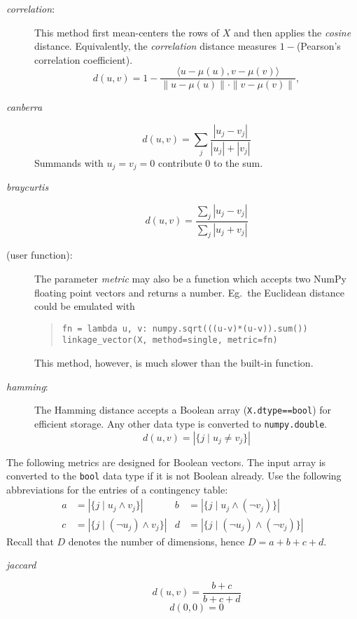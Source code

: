 \documentclass[fontsize=10pt,paper=letter,BCOR=-6mm,DIV=8]{scrartcl}
\makeatletter
\newcommand*\q{\textquotesingle}
\newenvironment{methods}{%
  \list{}{\labelwidth\z@
    \itemindent-\leftmargin
    \let\makelabel\methodslabel}%
}{%
  \endlist
}
\newcommand*{\methodslabel}[1]{%
  \hbox to \textwidth{\hspace{\labelsep}%
  \normalfont\bfseries\ttfamily
  #1\hskip-\labelsep\hfill}%
}
\makeatother
\begin{document}
\begin{methods}
\begin{description}
\item[\normalfont\textit{\q correlation\q}:] This method first mean-centers the rows of $X$ and then applies the \textit{cosine} distance. Equivalently, the \textit{correlation} distance measures $1-{}$\textrm{(Pearson's correlation coefficient)}.
\[
 d(u,v) = 1 - \frac{\langle u-\mu(u),v-\mu(v)\rangle}{\|u-\mu(u)\|\cdot\|v-\mu(v)\|},
\]

\item[\normalfont\textit{\q canberra\q}]
\[
 d(u,v) = \sum_j\frac{|u_j-v_j|}{|u_j|+|v_j|}
\]
Summands with $u_j=v_j=0$ contribute 0 to the sum.

\item[\normalfont\textit{\q braycurtis\q}]
\[
 d(u,v) = \frac{\sum_j |u_j-v_j|}{\sum_j |u_j+v_j|}
\]

\item[\textnormal{(user function):}] The parameter \textit{metric} may also be a function which accepts two NumPy floating point vectors and returns a number. Eg.\ the Euclidean distance could be emulated with
\begin{quote}
\texttt{fn = lambda u, v: numpy.sqrt(((u-v)*(u-v)).sum())}\\
\texttt{linkage\_vector(X, method=\q single\q, metric=fn)}
\end{quote}
This method, however, is much slower than the built-in function.

\item[\normalfont\textit{\q hamming\q}:] The Hamming distance accepts a Boolean array (\texttt{X.\allowbreak dtype\allowbreak ==\allowbreak bool}) for efficient storage. Any other data type is converted to \texttt{numpy.double}.
\[
 d(u,v) = |\{j\mid u_j\neq v_j\}|
\]

\end{description}
The following metrics are designed for Boolean vectors. The input array is converted to the \texttt{bool} data type if it is not Boolean already. Use the following abbreviations for the entries of a contingency table:
\begin{align*}
a &= |\{j\mid u_j\land v_j \}| & b &= |\{j\mid u_j\land(\lnot v_j)\}|\\
c &= |\{j\mid (\lnot u_j)\land v_j \}| & d &= |\{j\mid (\lnot u_j)\land(\lnot v_j)\}|
\end{align*}
Recall that $D$ denotes the number of dimensions, hence $D=a+b+c+d$.


\begin{description}
\item[\normalfont\textit{\q jaccard\q}]
\label{jaccard}
\[
 d(u,v) = \frac{b+c}{b+c+d}
\]
\[
 d(0,0) = 0
\]


\end{description}
\end{methods}
\end{document}
